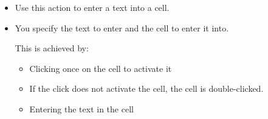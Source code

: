 \begin{itemize}
\item Use this action to enter a text into a cell.
\item You specify the text to enter and the cell to enter it into. 

This is achieved by:
\begin{itemize}
\item Clicking once on the cell to activate it
\item If the click does not activate the cell, the cell is double-clicked.
\item Entering the text in the cell
\end{itemize}
\end{itemize}
